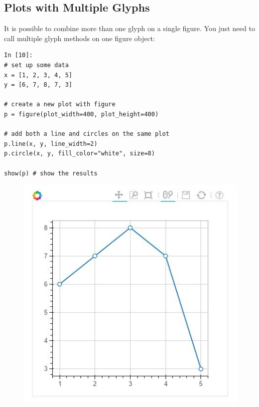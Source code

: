 \documentclass[a4paper,12pt]{article}
\begin{document}
\subsection{Plots with Multiple Glyphs}
It is possible to combine more than one glyph on a single figure. You just need to call multiple glyph methods on one figure object:
\begin{framed}
	\begin{verbatim}
In [10]:
# set up some data
x = [1, 2, 3, 4, 5]
y = [6, 7, 8, 7, 3]

# create a new plot with figure
p = figure(plot_width=400, plot_height=400)

# add both a line and circles on the same plot
p.line(x, y, line_width=2)
p.circle(x, y, fill_color="white", size=8)

show(p) # show the results

\end{verbatim}
\end{framed}
\begin{figure}[h!]
\centering
\includegraphics[width=0.7\linewidth]{images/01-BasicPlot-LinePlot-2}
\caption{}
\label{fig:01-BasicPlot-LinePlot-2}
\end{figure}
\end{document}
